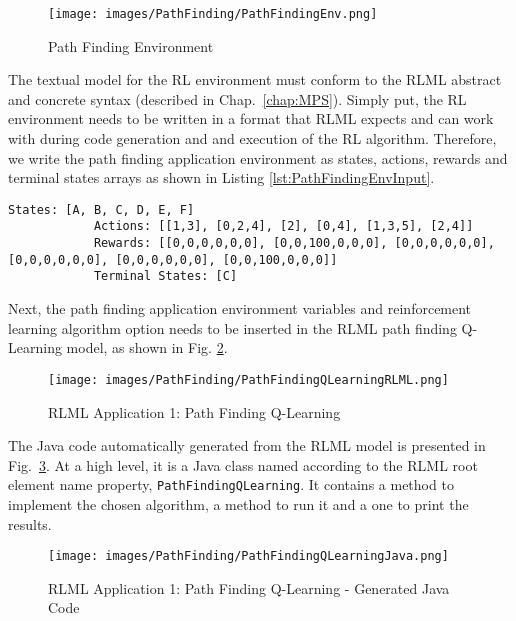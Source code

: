 \documentclass[11pt,letterpaper]{ryersonSGSThesis}
\begin{document}
\begin{ryersonSGSThesis}
    \begin{figure}[!tbh]
        \centering
        \texttt{[image: images/PathFinding/PathFindingEnv.png]}
        \caption{Path Finding Environment}
        \label{fig:PathFindingEnv}
    \end{figure} 
    
   The textual model for the RL environment must conform to the RLML abstract and concrete syntax (described in Chap.~\ref{chap:MPS}). Simply put, the RL environment needs to be written in a format that RLML expects and can work with during code generation and and execution of the RL algorithm. Therefore, we write the path finding application environment as states, actions, rewards and terminal states arrays as shown in Listing \ref{lst:PathFindingEnvInput}.
    
    \begin{minipage}{\linewidth}
         \begin{lstlisting}[caption={The Input Values for Path Finding Environment.},label={lst:PathFindingEnvInput}]
            States: [A, B, C, D, E, F] 
            Actions: [[1,3], [0,2,4], [2], [0,4], [1,3,5], [2,4]]
            Rewards: [[0,0,0,0,0,0], [0,0,100,0,0,0], [0,0,0,0,0,0], [0,0,0,0,0,0], [0,0,0,0,0,0], [0,0,100,0,0,0]]
            Terminal States: [C]
        \end{lstlisting}
    \end{minipage}
    
    Next, the path finding application environment variables and reinforcement learning algorithm option needs to be inserted in the RLML path finding Q-Learning model, as shown in Fig. \ref{fig:PathFindingQLearningRLML}.
    
    \begin{figure}[!tbh]
        \centering
        \texttt{[image: images/PathFinding/PathFindingQLearningRLML.png]}
        \caption{RLML Application 1: Path Finding Q-Learning}
        \label{fig:PathFindingQLearningRLML}
    \end{figure}

     The Java code automatically generated from the RLML model is presented in Fig.~\ref{fig:PathFindingQLearningJava}. At a high level, it is a Java class named according to the RLML root element name property, \texttt{PathFindingQLearning}. It contains a method to implement the chosen algorithm, a method to run it and a one to print the results.
    
    \begin{figure}[!tbh]
        \centering
        \texttt{[image: images/PathFinding/PathFindingQLearningJava.png]}
        \caption{RLML Application 1: Path Finding Q-Learning - Generated Java Code}
        \label{fig:PathFindingQLearningJava}
    \end{figure} 
    

\end{ryersonSGSThesis}
\end{document}

